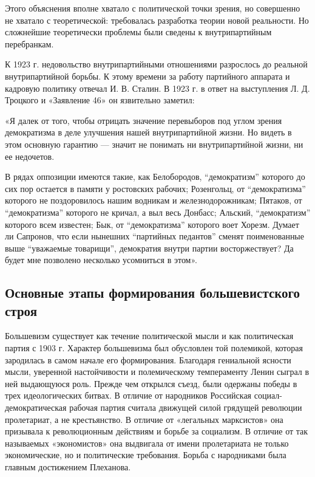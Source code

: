 \documentclass{article}
\begin{document}
\hfill

Этого объяснения вполне хватало с политической точки зрения, но совершенно не хватало с теоретической: требовалась разработка теории новой реальности. Но сложнейшие теоретически проблемы были сведены к внутрипартийным перебранкам.

\hfill

К 1923 г. недовольство внутрипартийными отношениями разрослось до реальной внутрипартийной борьбы. К этому времени за работу партийного аппарата и кадровую политику отвечал И. В. Сталин. В 1923 г. в ответ на выступления Л. Д. Троцкого и «Заявление 46» он язвительно заметил:

«Я далек от того, чтобы отрицать значение перевыборов под углом зрения демократизма в деле улучшения нашей внутрипартийной жизни. Но видеть в этом основную гарантию — значит не понимать ни внутрипартийной жизни, ни ее недочетов.

В рядах оппозиции имеются такие, как Белобородов, “демократизм” которого до сих пор остается в памяти у ростовских рабочих; Розенгольц, от “демократизма” которого не поздоровилось нашим водникам и железнодорожникам; Пятаков, от “демократизма” которого не кричал, а выл весь Донбасс; Альский, “демократизм” которого всем известен; Бык, от “демократизма” которого воет Хорезм. Думает ли Сапронов, что если нынешних “партийных педантов” сменят поименованные выше “уважаемые товарищи”, демократия внутри партии восторжествует? Да будет мне позволено несколько усомниться в этом».

\pagebreak
\subsection{Основные этапы формирования большевистского строя}

Большевизм существует как течение политической мысли и как политическая партия с 1903 г. Характер большевизма был обусловлен той полемикой, которая зародилась в самом начале его формирования. Благодаря гениальной ясности мысли, уверенной настойчивости и полемическому темпераменту Ленин сыграл в ней выдающуюся роль. Прежде чем открылся съезд, были одержаны победы в трех идеологических битвах. В отличие от народников Российская социал-демократическая рабочая партия считала движущей силой грядущей революции пролетариат, а не крестьянство. В отличие от «легальных марксистов» она призывала к революционным действиям и борьбе за социализм. В отличие от так называемых «экономистов» она выдвигала от имени пролетариата не только экономические, но и политические требования. Борьба с народниками была главным достижением Плеханова.
\end{document}
